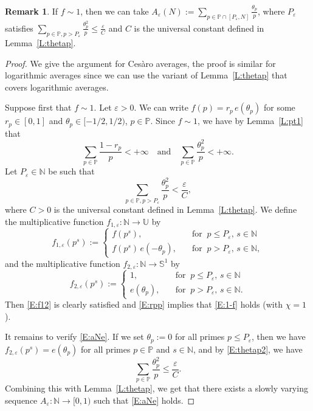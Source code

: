 \documentclass[11pt]{amsart}
\theoremstyle{definition}
\newtheorem*{remark}{Remark}
\newcommand{\N}{{\mathbb N}}
\renewcommand{\P}{{\mathbb P}}
\renewcommand{\S}{\mathbb{S}}
\newcommand{\U}{{\mathbb U}}
\begin{document}
 \begin{remark}
 	If $f\sim 1$, then we can take  $A_\varepsilon(N):=\sum_{p\in \P\cap [P_\varepsilon,N]}\frac{\theta_p}{p}$,
 		where $P_\varepsilon$ satisfies $\sum_{p\in \P, p>P_\varepsilon}\frac{\theta_p^2}{p}\leq \frac{\varepsilon}{C}$ and $C$ is the universal constant defined in Lemma~\ref{L:thetap}.
 \end{remark}
 \begin{proof}
 	We give the argument for Ces\`aro averages, the proof is similar for logarithmic averages since we can use the variant of Lemma~\ref{L:thetap} that covers logarithmic averages.
 	
 	Suppose first that $f\sim 1$.
 	Let $\varepsilon>0$. We can write $f(p)=r_p \, e(\theta_p)$ for some $r_p\in [0,1]$ and $\theta_p\in [-1/2,1/2)$, $p\in \P$.
 	Since $f\sim 1$, we have by Lemma~\ref{L:pt1} that
 	\begin{equation}\label{E:rpp}
 	\sum_{p\in\P} \frac{1-r_p}{p}<+\infty \quad \text{and} \quad \sum_{p\in\P}\frac{\theta_p^2}{p}<+\infty.
 	\end{equation}
 	Let $P_\varepsilon\in \N$ be  such that
 	\begin{equation}\label{E:thetap2}
 	\sum_{p\in\P, p>P_\varepsilon}\frac{\theta_p^2}{p}<\frac{\varepsilon}{C},
 	\end{equation}
  where $C>0$ is the universal constant defined in Lemma~\ref{L:thetap}.
 	 We  define the multiplicative function $f_{1,\varepsilon}\colon \N\to \U$ by
 	\begin{equation}\label{E:f1e}
 	f_{1,\varepsilon}(p^s):=\begin{cases} f(p^s),\quad  &\text{for } \ p\leq P_\varepsilon,\,  s\in \N  \\
 		f(p^s)\, e(-\theta_p), \quad  &  \text{for } \   p>P_\varepsilon, \, s\in \N,
 	\end{cases}
	\end{equation}
 	and the multiplicative function $f_{2,\varepsilon}\colon \N\to \S^1$ by
 	 $$
 	f_{2,\varepsilon}(p^s):=\begin{cases} 1, \quad  &\text{for } \  p\leq P_\varepsilon, \, s\in \N  \\
 		 e(\theta_p), \quad  &  \text{for }   \  p>P_\varepsilon, \, s\in \N.
 	\end{cases}
 	$$
 Then \eqref{E:f12} is clearly satisfied and \eqref{E:rpp} implies that   \eqref{E:1-f} holds (with $\chi=1$).

  It remains to verify  \eqref{E:aNe}.
If we set $\theta_p:=0$ for all primes $p\leq P_\varepsilon$,  then we have $f_{2,\varepsilon}(p^s)=e(\theta_p)$ for all primes $p\in \P$ and $s\in \N$, and by  \eqref{E:thetap2},  we have
 \begin{equation}\label{E:thetap}
 	\sum_{p\in\P}\frac{\theta_p^2}{p} \leq \frac{\varepsilon}{C}.
 \end{equation}
   Combining  this with  Lemma~\ref{L:thetap},   we get   that there exists a slowly varying sequence $A_\varepsilon\colon \N\to [0,1)$
    such that   \eqref{E:aNe} holds.



\end{proof}
\end{document}
